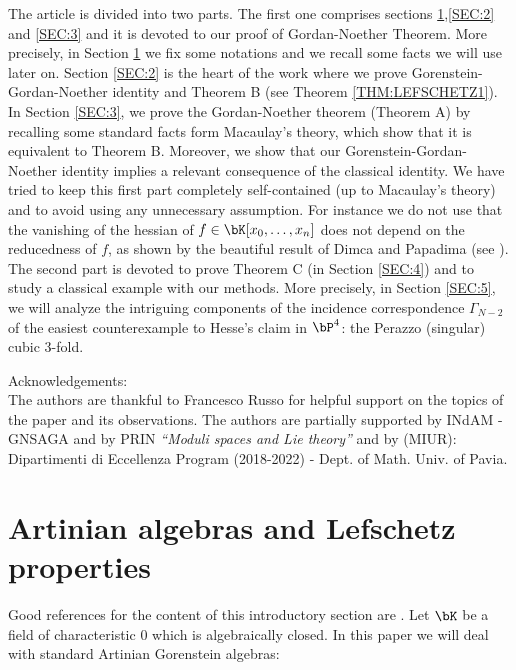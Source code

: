 \documentclass[a4paper,11pt]{amsart}
\begin{document}
The article is divided into two parts. The first one comprises sections \ref{SEC:1},\ref{SEC:2} and \ref{SEC:3} and it is devoted to our proof of Gordan-Noether Theorem. More precisely, in Section \ref{SEC:1} we fix some notations and we recall some facts we will use later on. Section \ref{SEC:2} is the heart of the work where we prove Gorenstein-Gordan-Noether identity and Theorem B (see Theorem \ref{THM:LEFSCHETZ1}). In Section \ref{SEC:3}, we prove the Gordan-Noether theorem (Theorem A) by recalling some standard facts form Macaulay's theory, which show that it is equivalent to Theorem B. 
Moreover, we show that our Gorenstein-Gordan-Noether identity implies a relevant consequence of the classical identity. We have tried to keep this first part completely self-contained (up to Macaulay's theory) and to avoid using any unnecessary assumption. For instance we do not use that the vanishing of the hessian of $f\in \bK[x_0,\dots,x_n]$ does not depend on the reducedness of $f$, as shown by the beautiful result of Dimca and Papadima (see \cite{DP03}).
The second part is devoted to prove Theorem C (in Section \ref{SEC:4}) and to study a classical example with our methods. More precisely, in Section \ref{SEC:5}, we will analyze the intriguing components of the incidence correspondence $\Gamma_{N-2}$ of the easiest counterexample to Hesse's claim in $\bP^4$: the Perazzo (singular) cubic $3$-fold.
\bigskip

\noindent Acknowledgements: \\
The authors are thankful to Francesco Russo for helpful support on the topics of the paper and its observations. The authors are partially supported by INdAM - GNSAGA and by PRIN \emph{``Moduli spaces and Lie theory''} and by (MIUR): Dipartimenti di Eccellenza Program (2018-2022) - Dept. of Math. Univ. of Pavia.\\ 





\section{Artinian algebras and Lefschetz properties}
\label{SEC:1}

Good references for the content of this introductory section are \cite{textVoi2,bookLef,Rus16}. Let $\bK$ be a field of characteristic $0$ which is algebraically closed. In this paper we will deal with standard Artinian Gorenstein algebras:
\end{document}
